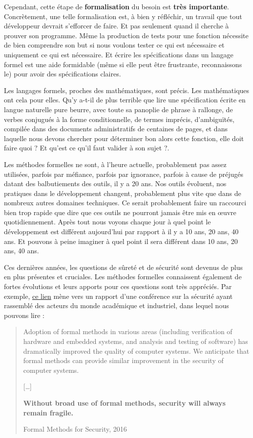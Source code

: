 \documentclass[12pt,francais,]{scrbook}
\begin{document}
Cependant, cette étape de \textbf{formalisation} du besoin est
\textbf{très importante}. Concrètement, une telle formalisation est, à
bien y réfléchir, un travail que tout développeur devrait s'efforcer de
faire. Et pas seulement quand il cherche à prouver son programme. Même
la production de tests pour une fonction nécessite de bien comprendre
son but si nous voulons tester ce qui est nécessaire et uniquement ce
qui est nécessaire. Et écrire les spécifications dans un langage formel
est une aide formidable (même si elle peut être frustrante,
reconnaissons le) pour avoir des spécifications claires.

Les langages formels, proches des mathématiques, sont précis. Les
mathématiques ont cela pour elles. Qu'y a-t-il de plus terrible que lire
une spécification écrite en langue naturelle pure beurre, avec toute sa
panoplie de phrase à rallonge, de verbes conjugués à la forme
conditionnelle, de termes imprécis, d'ambiguïtés, compilée dans des
documents administratifs de centaines de pages, et dans laquelle nous
devons chercher pour déterminer \og{}bon alors cette fonction, elle doit
faire quoi ? Et qu'est ce qu'il faut valider à son sujet ?\fg{}.

Les méthodes formelles ne sont, à l'heure actuelle, probablement pas
assez utilisées, parfois par méfiance, parfois par ignorance, parfois à
cause de préjugés datant des balbutiements des outils, il y a 20 ans.
Nos outils évoluent, nos pratiques dans le développement changent,
probablement plus vite que dans de nombreux autres domaines techniques.
Ce serait probablement faire un raccourci bien trop rapide que dire que
ces outils ne pourront jamais être mis en œuvre quotidiennement. Après
tout nous voyons chaque jour à quel point le développement est différent
aujourd'hui par rapport à il y a 10 ans, 20 ans, 40 ans. Et pouvons à
peine imaginer à quel point il sera différent dans 10 ans, 20 ans, 40
ans.

Ces dernières années, les questions de sûreté et de sécurité sont
devenus de plus en plus présentes et cruciales. Les méthodes formelles
connaissent également de fortes évolutions et leurs apports pour ces
questions sont très appréciés. Par exemple,
\href{http://sfm.seas.harvard.edu/report.html}{ce lien} mène vers un
rapport d'une conférence sur la sécurité ayant rassemblé des acteurs du
monde académique et industriel, dans lequel nous pouvons lire :

\begin{quote}
Adoption of formal methods in various areas (including verification of
hardware and embedded systems, and analysis and testing of software) has
dramatically improved the quality of computer systems. We anticipate
that formal methods can provide similar improvement in the security of
computer systems.

{[}\ldots{}{]}

\textbf{Without broad use of formal methods, security will always remain
  fragile.}

Formal Methods for Security, 2016
\end{quote}
\end{document}
